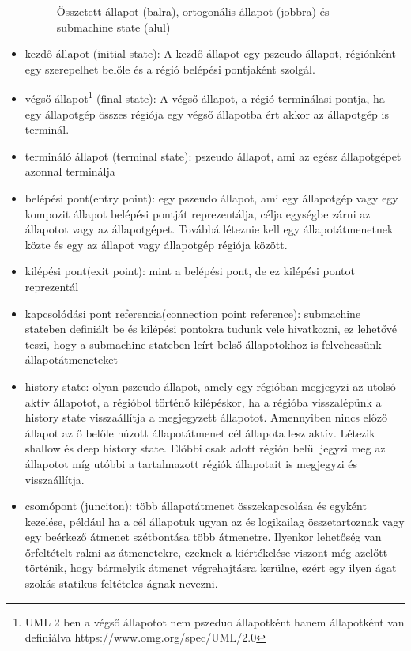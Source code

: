 \begin{itemize}
\begin{figure}[!ht]
		\caption{Összetett állapot (balra), ortogonális állapot (jobbra) és submachine state (alul)}
	\end{figure}
	\item kezdő állapot (initial state): A kezdő állapot egy pszeudo állapot, régiónként egy szerepelhet belőle és a régió belépési pontjaként szolgál.
	\item végső állapot\footnote{UML 2 ben a végső állapotot nem pszeduo állapotként hanem állapotként van definiálva https://www.omg.org/spec/UML/2.0} (final state): A végső állapot, a régió terminálasi pontja, ha egy állapotgép összes régiója egy végső állapotba ért akkor az állapotgép is terminál.
	\item termináló állapot (terminal state): pszeudo állapot, ami az egész állapotgépet azonnal terminálja
	\item belépési pont(entry point): egy pszeudo állapot, ami egy állapotgép vagy egy kompozit állapot belépési pontját reprezentálja, célja egységbe zárni az állapotot vagy az állapotgépet. Továbbá léteznie kell egy állapotátmenetnek közte és egy az állapot vagy állapotgép régiója között.
	\item kilépési pont(exit point): mint a belépési pont, de ez kilépési pontot reprezentál
	\item kapcsolódási pont referencia(connection point reference): submachine stateben definiált be és kilépési pontokra tudunk vele hivatkozni, ez lehetővé teszi, hogy a submachine stateben leírt belső állapotokhoz is felvehessünk állapotátmeneteket
	\item history state: olyan pszeudo állapot, amely egy régióban megjegyzi az utolsó aktív állapotot, a régióbol történő kilépéskor, ha a régióba visszalépünk a history state visszaállítja a megjegyzett állapotot. Amennyiben nincs előző állapot az ő belőle húzott állapotátmenet cél állapota lesz aktív. Létezik shallow és deep history state. Előbbi csak adott régión belül jegyzi meg az állapotot míg utóbbi a tartalmazott régiók állapotait is megjegyzi és visszaállítja.
	\item csomópont (junciton): több állapotátmenet összekapcsolása és egyként kezelése, például ha a cél állapotuk ugyan az és logikailag összetartoznak vagy egy beérkező átmenet szétbontása több átmenetre. Ilyenkor lehetőség van őrfeltételt rakni az átmenetekre, ezeknek a kiértékelése viszont még azelőtt történik, hogy bármelyik átmenet végrehajtásra kerülne, ezért egy ilyen ágat szokás statikus feltételes ágnak nevezni.

\end{itemize}
